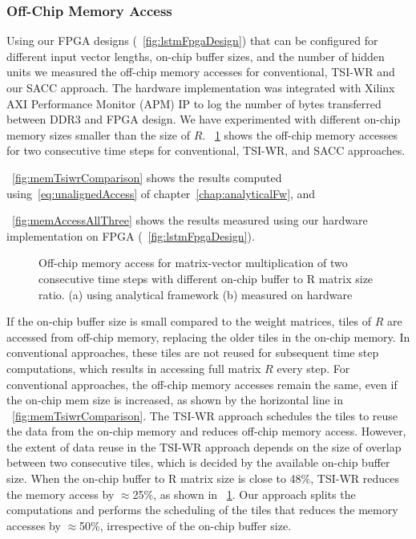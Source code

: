 {\subsubsection{Off-Chip Memory Access}
Using our FPGA designs (\figurename{~\ref{fig:lstmFpgaDesign}}) that can be configured for different input vector lengths, on-chip buffer sizes, and the number of hidden units we measured the off-chip memory accesses for conventional, TSI-WR and our SACC approach. The hardware implementation was integrated with Xilinx AXI Performance Monitor (APM) IP to log the number of bytes transferred between DDR3 and FPGA design.
We have experimented with different on-chip memory sizes smaller than the size of $R$. \figurename{~\ref{fig:memAccessImprovement}} shows the off-chip memory accesses for two consecutive time steps for conventional, TSI-WR, and SACC approaches.  \figurename{~\ref{fig:memTsiwrComparison} shows the results computed using~\eqref{eq:unalignedAccess} of chapter~\ref{chap:analyticalFw}, and \figurename{~\ref{fig:memAccessAllThree} shows the results measured using our hardware implementation on FPGA (\figurename{~\ref{fig:lstmFpgaDesign}}). 

\begin{figure}[htb!]
	\centering
	\hspace{2.0em}
	\caption{Off-chip memory access for matrix-vector multiplication of two consecutive time steps with different on-chip buffer to R matrix size ratio.  (a)  using analytical framework (b) measured on hardware}	
	\label{fig:memAccessImprovement}
	\vspace{-1.0em}	
\end{figure}
If the on-chip buffer size is small compared to the weight matrices, tiles of $R$ are accessed from off-chip memory, replacing the older tiles in the on-chip memory. In conventional approaches, these tiles are not reused for subsequent time step computations, which results in accessing full matrix $R$ every step. For conventional approaches, the off-chip memory accesses remain the same, even if the on-chip mem size is increased, as shown by the horizontal line in \figurename{~\ref{fig:memTsiwrComparison}.
The TSI-WR approach schedules the tiles to reuse the data from the on-chip memory and reduces off-chip memory access. However, the extent of data reuse in the TSI-WR approach depends on the size of overlap between two consecutive tiles, which is decided by the available on-chip buffer size. When the on-chip buffer to R matrix size is close to 48\%, TSI-WR reduces the memory access by $\approx$25\%, as shown in \figurename{~\ref{fig:memAccessImprovement}}. Our approach splits the computations and performs the scheduling of the tiles that reduces the memory accesses by $\approx$50\%, irrespective of the on-chip buffer size.
}}}}
